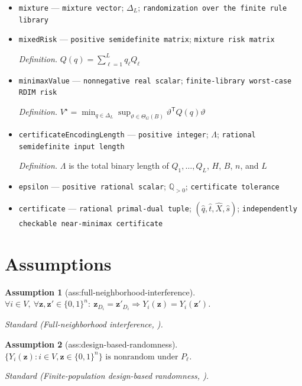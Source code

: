 \documentclass{article}
\newtheorem{assumption}{Assumption}
\begin{document}
\begin{itemize}
  \item \texttt{mixture} --- \texttt{mixture vector}; \(\Delta_L\); \texttt{randomization over the finite rule library}
  \item \texttt{mixedRisk} --- \texttt{positive semidefinite matrix}; \texttt{mixture risk matrix}
  \par\smallskip\noindent\emph{Definition.} \(Q(q)=\sum_{\ell=1}^L q_{\ell}Q_{\ell}\)
  \item \texttt{minimaxValue} --- \texttt{nonnegative real scalar}; \texttt{finite-\allowbreak{}library worst-\allowbreak{}case RDIM risk}
  \par\smallskip\noindent\emph{Definition.} \(V^\star=\min_{q\in\Delta_L}\sup_{\vartheta\in\Theta_G(B)}\vartheta^{\mathsf T}Q(q)\vartheta\)
  \item \texttt{certificateEncodingLength} --- \texttt{positive integer}; \(\Lambda\); \texttt{rational semidefinite input length}
  \par\smallskip\noindent\emph{Definition.} \(\Lambda\) is the total binary length of \(Q_1,\ldots,Q_L\), \(H\), \(B\), \(n\), and \(L\)
  \item \texttt{epsilon} --- \texttt{positive rational scalar}; \(\mathbb Q_{>0}\); \texttt{certificate tolerance}
  \item \texttt{certificate} --- \texttt{rational primal-\allowbreak{}dual tuple}; \((\widehat q,\widehat t,\widehat X,\widehat s)\); \texttt{independently checkable near-\allowbreak{}minimax certificate}
\end{itemize}

\section{Assumptions}

\begin{assumption}[ass:full-neighborhood-interference]\label{ass:full-neighborhood-interference}
\(\forall i\in V,\ \forall \mathbf z,\mathbf z'\in\{0,1\}^n:\ \mathbf z_{D_i}=\mathbf z'_{D_i}\Rightarrow Y_i(\mathbf z)=Y_i(\mathbf z')\).
\par\smallskip\noindent\emph{Standard} (Full-neighborhood interference, \cite{ShiYangQinLi2024}).
\end{assumption}

\begin{assumption}[ass:design-based-randomness]\label{ass:design-based-randomness}
\(\{Y_i(\mathbf z):i\in V,\mathbf z\in\{0,1\}^n\}\text{ is nonrandom under }P_{\ell}\).
\par\smallskip\noindent\emph{Standard} (Finite-population design-based randomness, \cite{AronowSamii2017GeneralInterference}).
\end{assumption}
\end{document}
